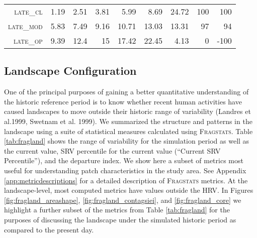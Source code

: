 \begin{table}[!htbp]
\begin{tabular}{@{}rrrrrr|rrr@{}}
\footnotesize \textsc{late\_cl  }      & \footnotesize 1.19          & \footnotesize 2.51     & \footnotesize 3.81     & \footnotesize 5.99     & \footnotesize 8.69      & \footnotesize 24.72       & \footnotesize  100    & \footnotesize 100      \\
\footnotesize \textsc{late\_mod }      & \footnotesize 5.83          & \footnotesize 7.49     & \footnotesize 9.16     & \footnotesize 10.71    & \footnotesize 13.03     & \footnotesize 13.31       & \footnotesize  97     & \footnotesize 94     \\
\footnotesize \textsc{late\_op  }      & \footnotesize 9.39          & \footnotesize 12.4     & \footnotesize 15       & \footnotesize 17.42    & \footnotesize 22.45     & \footnotesize 4.13        & \footnotesize  0     & \footnotesize  -100  \\ \bottomrule 
\end{tabular}
\end{table}

\clearpage


\subsection{Landscape Configuration}
One of the principal purposes of gaining a better quantitative understanding of the historic reference period is to know whether recent human activities have caused landscapes to move outside their historic range of variability (Landres et al.1999, Swetnam et al. 1999). We summarized the structure and patterns in the landscape using a suite of statistical measures calculated using \textsc{Fragstats}. Table \ref{tab:fragland} shows the range of variability for the simulation period as well as the current value, SRV percentile for the current value (``Current SRV Percentile''), and the departure index. We show here a subset of metrics most useful for understanding patch characteristics in the study area. See Appendix \ref{app:metricdescriptions} for a detailed description of \textsc{Fragstats} metrics. At the landscape-level, most computed metrics have values outside the HRV. In Figures \ref{fig:fragland_areashape}, \ref{fig:fragland_contagsiei}, and \ref{fig:fragland_core} we highlight a further subset of the metrics from Table \ref{tab:fragland} for the purposes of discussing the landscape under the simulated historic period as compared to the present day. %


